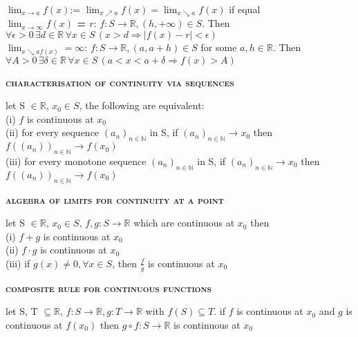 \documentclass[a4paper]{article}
\begin{document}
\begin{multicols}{2}
\begin{framed}
	\noindent
	\textbf{$\lim_{x \rightarrow a}f(x)$}:= $\lim_{x \nearrow a} f(x) = \lim_{x \searrow a} f(x)$ if equal\\
	
	\noindent
	\textbf{$\lim_{x \rightarrow \infty}f(x)$ = $r$}: $f:S \rightarrow \mathbb{R}, (h, +\infty) \in S$. Then $\forall \epsilon > 0 \, \exists d \in \mathbb{R} \, \forall x \in S \, (x > d \Rightarrow \vert f(x) - r \vert < \epsilon)$\\
	
	\noindent
	\textbf{$\lim_{x \searrow a f(x)} = \infty$}: $f:S \rightarrow \mathbb{R}, (a, a+h) \in S$ for some $a, h \in \mathbb{R}$. Then $\forall A > 0 \, \exists \delta \in \mathbb{R} \, \forall x \in S \, (a < x < a + \delta \Rightarrow f(x) > A)$
\end{framed}

\begin{framed}
	\begin{center}
		\textbf{\textsc{characterisation of continuity via sequences}}
	\end{center}
	let S $\in \mathbb{R}$, $x_0 \in S$, the following are equivalent:\\
	(i) $f$ is continuous at $x_0$\\
	(ii) for every sequence $(a_n)_{n \in \mathbb{N}}$ in S, if $(a_n)_{n \in \mathbb{N}} \rightarrow x_0$ then $f((a_n))_{n \in \mathbb{N}} \rightarrow f(x_0)$\\
	(iii) for every monotone sequence $(a_n)_{n \in \mathbb{N}}$ in S, if $(a_n)_{n \in \mathbb{N}} \rightarrow x_0$ then $f((a_n))_{n \in \mathbb{N}} \rightarrow f(x_0)$
\end{framed}

\begin{framed}
	\begin{center}
		\textbf{\textsc{algebra of limits for continuity at a point}}
	\end{center}
	let S $\in \mathbb{R}$, $x_0 \in S$, $f, g: S \rightarrow \mathbb{R}$ which are continuous at $x_0$ then\\
	(i) $f+g$ is continuous at $x_0$\\
	(ii) $f \cdot g$ is continuous at $x_0$\\
	(iii) if $g(x) \neq 0, \forall x \in S$, then $\frac{f}{g}$ is continuous at $x_0$
\end{framed}

\begin{framed}
	\begin{center}
		\textbf{\textsc{composite rule for continuous functions}}
	\end{center}
	let S, T $\subseteq \mathbb{R}$, $f: S \rightarrow \mathbb{R}, g: T \rightarrow \mathbb{R}$ with $f(S) \subseteq T$. if $f$ is continuous at $x_0$ and $g$ is continuous at $f(x_0)$ then $g \circ f: S \rightarrow \mathbb{R}$ is continuous at $x_0$
\end{framed}


\end{multicols}
\end{document}
